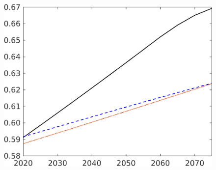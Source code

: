 \begin{figure}[h!!]
\begin{minipage}[]{0.32\textwidth}
	\end{minipage}
	\begin{minipage}[]{0.32\textwidth}
		\includegraphics[width=1\textwidth]{../../codding_model/own_basedOnFried/optimalPol_elastS_DisuSci/figures/all_1705/N_CompEffOPT_NOT_NoTaus_spillover0_sep1_BN0_ineq0_red0_etaa0.79_lgd0.png}
	\end{minipage}
\end{figure}

